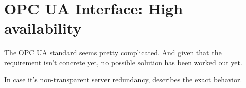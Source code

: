 \section{OPC UA Interface: High availability}\label{sec:approach:opc-ua}
The OPC UA standard seems pretty complicated. And given that the requirement
isn't concrete yet, no possible solution has been worked out yet.

In case it's non-transparent server redundancy, \cite[6.4.2.4 Non-transparent
Redundancy, p.~96]{opc-ua:behavior:server-redundancy} describes the exact
behavior.

